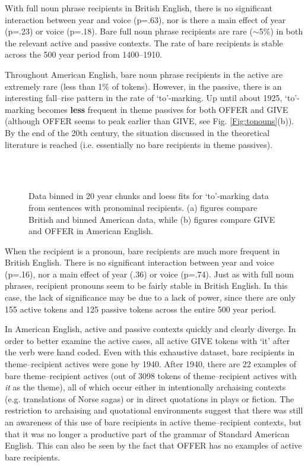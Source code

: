 With full noun phrase recipients in British English, there is no significant interaction between year and voice (p=.63), nor is there a main effect of year (p=.23) or voice (p=.18). Bare full noun phrase recipients are rare ($\sim$5\%) in both the relevant active and passive contexts. The rate of bare recipients is stable across the 500 year period from 1400--1910.

Throughout American English, bare noun phrase recipients in the active are extremely rare (less than 1\% of tokens). However, in the passive, there is an interesting fall--rise pattern in the rate of `to'-marking. Up until about 1925, `to'-marking becomes \textbf{less} frequent in theme passives for both OFFER and GIVE (although OFFER seems to peak earlier than GIVE, see Fig. \ref{Fig:tonouns}(b)). By the end of the 20th century, the situation discussed in the theoretical literature is reached (i.e. essentially no bare recipients in theme passives).

\begin{figure}[p]
\\
\\
\label{Fig:topros}
\caption{Data binned in 20 year chunks and loess fits for `to'-marking data from sentences with pronominal recipients. (a) figures compare British and binned American data, while (b) figures compare GIVE and OFFER in American English.}
\end{figure}


When the recipient is a pronoun, bare recipients are much more frequent in British English. There is no significant interaction between year and voice (p=.16), nor a main effect of year (.36) or voice (p=.74). Just as with full noun phrases, recipient pronouns seem to be fairly stable in British English. In this case, the lack of significance may be due to a lack of power, since there are only 155 active tokens and 125 passive tokens across the entire 500 year period.

In American English, active and passive contexts quickly and clearly diverge. In order to better examine the active cases, all active GIVE tokens with `it' after the verb were hand coded. Even with this exhaustive dataset, bare recipients in theme--recipient actives were gone by 1940. After 1940, there are 22 examples of bare theme--recipient actives (out of 3098 tokens of theme--recipient actives with \textit{it} as the theme), all of which occur either in intentionally archaising contexts (e.g. translations of Norse sagas) or in direct quotations in plays or fiction. The restriction to archaising and quotational environments suggest that there was still an awareness of this use of bare recipients in active theme--recipient contexts, but that it was no longer a productive part of the grammar of Standard American English. This can also be seen by the fact that OFFER has no examples of active bare recipients.

